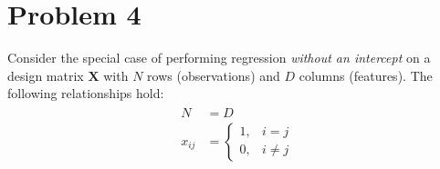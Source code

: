 \documentclass[11pt,twoside]{article}
\newcommand{\?}{\stackrel{?}{=}}
\begin{document}
\section*{Problem 4 }
Consider the special case of performing regression \textit{without an intercept} on a design matrix $\bm X$ with $N$ rows (observations) and $D$ columns (features). The following relationships hold:
\begin{align}
  \label{eq:0}
  \begin{split}
  N &= D \\
  x_{ij} &=
           \begin{cases}
             1, & i = j \\
             0, & i \ne j
           \end{cases}
         \end{split}
\end{align}
\end{document}
